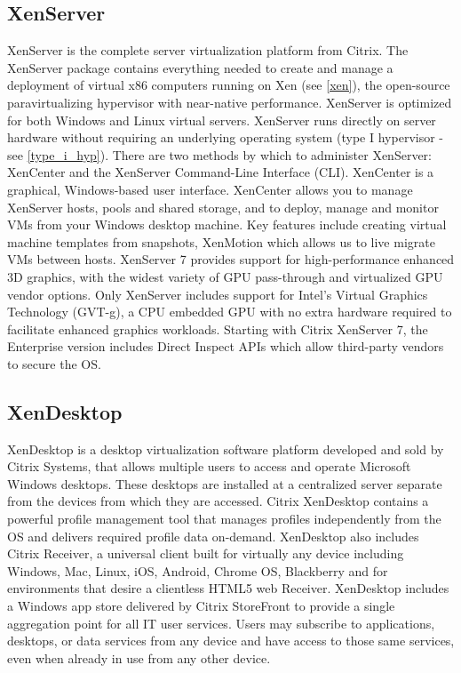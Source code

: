 \subsection{XenServer}
XenServer is the complete server virtualization platform from Citrix. The XenServer package contains everything needed to create and manage a deployment of virtual x86 computers running on Xen (see \ref{xen}), the open-source paravirtualizing hypervisor with near-native performance. XenServer is optimized for both Windows and Linux virtual servers. XenServer runs directly on server hardware without requiring an underlying operating system (type I hypervisor - see \ref{type_i_hyp}). There are two methods by which to administer XenServer: XenCenter and the XenServer Command-Line Interface (CLI). XenCenter is a graphical, Windows-based user interface. XenCenter allows you to manage XenServer hosts, pools and shared storage, and to deploy, manage and monitor VMs from your Windows desktop machine. Key features include creating virtual machine templates from snapshots, XenMotion which allows us to live migrate VMs between hosts. XenServer 7 provides support for high-performance enhanced 3D graphics, with the widest variety of GPU pass-through and virtualized GPU vendor options. Only XenServer includes support for Intel’s Virtual Graphics Technology (GVT-g), a CPU embedded GPU with no extra hardware required to facilitate enhanced graphics workloads. Starting with Citrix XenServer 7, the Enterprise version includes Direct Inspect APIs which allow third-party vendors to secure the OS.

\subsection{XenDesktop}
XenDesktop is a desktop virtualization software platform developed and sold by Citrix Systems, that allows multiple users to access and operate Microsoft Windows desktops. These desktops are installed at a centralized server separate from the devices from which they are accessed. Citrix XenDesktop contains a powerful profile management tool that manages profiles independently from the OS and delivers required profile data on-demand. XenDesktop also includes Citrix Receiver, a universal client built for virtually any device including Windows, Mac, Linux, iOS, Android, Chrome OS, Blackberry and for environments that desire a clientless HTML5 web Receiver. XenDesktop includes a Windows app store delivered by Citrix StoreFront to provide a single aggregation point for all IT user services. Users may subscribe to applications, desktops, or data services from any device and have access to those same services, even when already in use from any other device.

